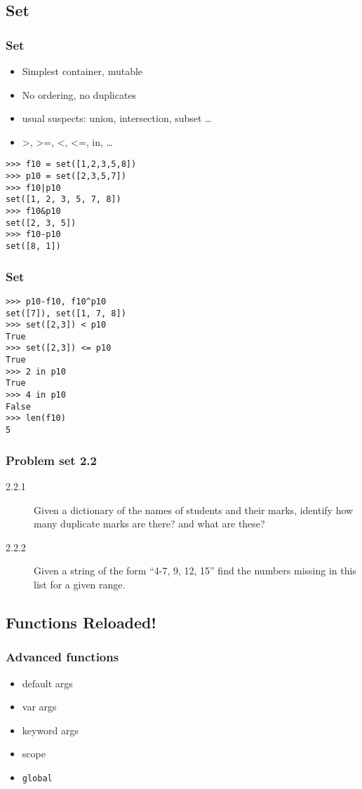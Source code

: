 \documentclass[14pt,compress]{beamer}
\newcounter{time}
\newcommand{\inctime}[1]{\addtocounter{time}{#1}{\tiny \thetime\ m}}
\newcommand{\typ}[1]{\texttt{#1}}
\begin{document}
\subsection{Set}
\begin{frame}[fragile]
  \frametitle{Set}
    \begin{itemize}
      \item Simplest container, mutable
      \item No ordering, no duplicates
      \item usual suspects: union, intersection, subset \ldots
      \item >, >=, <, <=, in, \ldots
    \end{itemize}
    \begin{lstlisting}
>>> f10 = set([1,2,3,5,8])
>>> p10 = set([2,3,5,7])
>>> f10|p10
set([1, 2, 3, 5, 7, 8])
>>> f10&p10
set([2, 3, 5])
>>> f10-p10
set([8, 1])
\end{lstlisting}
\end{frame}

\begin{frame}[fragile]
  \frametitle{Set}
    \begin{lstlisting}
>>> p10-f10, f10^p10
set([7]), set([1, 7, 8])
>>> set([2,3]) < p10
True
>>> set([2,3]) <= p10
True
>>> 2 in p10
True
>>> 4 in p10
False
>>> len(f10)
5
\end{lstlisting}
\inctime{5}
\end{frame}


\begin{frame}
  \frametitle{Problem set 2.2}
  \begin{description}
    \item[2.2.1] Given a dictionary of the names of students and their marks, identify how many duplicate marks are there? and what are these?
    \item[2.2.2] Given a string of the form ``4-7, 9, 12, 15'' find the numbers missing in this list for a given range.
\end{description}
\inctime{10}
\end{frame}

\subsection{Functions Reloaded!}
\begin{frame}[fragile]
    \frametitle{Advanced functions}
    \begin{itemize}
        \item default args
        \item var args
        \item keyword args
        \item scope
        \item \typ{global}
      \end{itemize}
\end{frame}
\end{document}
